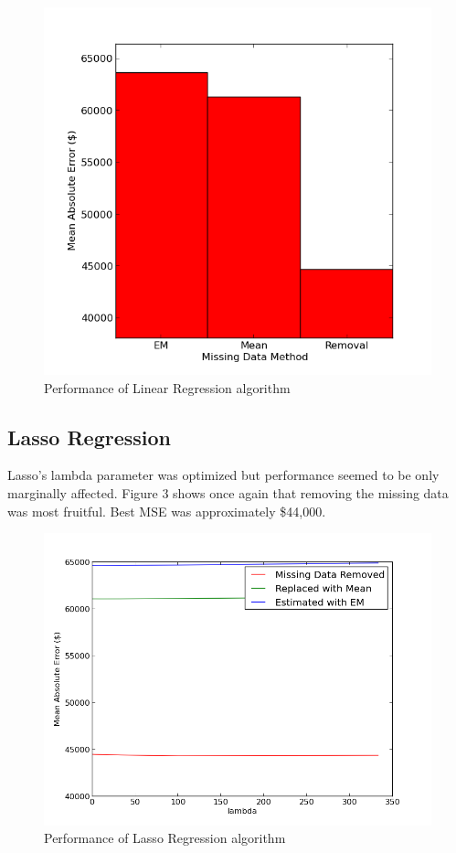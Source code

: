 \documentclass{acm_proc_article-sp}
\begin{document}
	 \begin{figure}[H]
   		\centering
  		\includegraphics[width=\linewidth]{linear_regression_tuning.png}
    		\caption{Performance of Linear Regression algorithm}
    		\label{fig:linreg}
	\end{figure}
	
\subsection{Lasso Regression}
	Lasso's lambda parameter was optimized but performance seemed to be only marginally affected. Figure 3 shows once again that removing the missing data was most fruitful. Best MSE was approximately \$44,000.
	
	 \begin{figure}[H]
   		\centering
  		\includegraphics[width=\linewidth]{lasso_tuning_plot.png}
    		\caption{Performance of Lasso Regression algorithm}
    		\label{fig:lassoreg}
	\end{figure}
	
\end{document}
